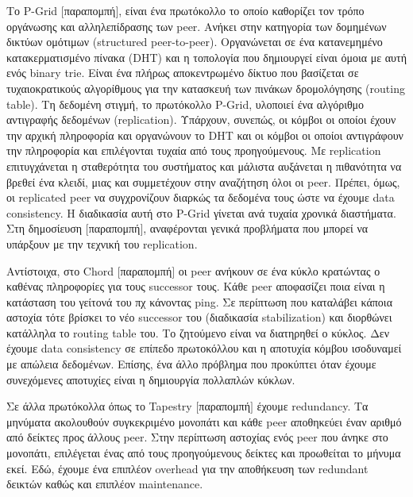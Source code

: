 Το P-Grid $[$παραπομπή$]$, είναι ένα πρωτόκολλο το οποίο καθορίζει τον 
τρόπο οργάνωσης και αλληλεπίδρασης των peer. Ανήκει στην κατηγορία των 
δομημένων δικτύων ομότιμων (structured peer-to-peer). Οργανώνεται σε ένα 
κατανεμημένο κατακερματισμένο πίνακα (DHT) και η τοπολογία που 
δημιουργεί είναι όμοια με αυτή ενός binary trie. Είναι ένα πλήρως 
αποκεντρωμένο δίκτυο που βασίζεται σε τυχαιοκρατικούς αλγορίθμους για 
την κατασκευή των πινάκων δρομολόγησης (routing table). Τη δεδομένη 
στιγμή, το πρωτόκολλο P-Grid, υλοποιεί ένα αλγόριθμο αντιγραφής 
δεδομένων (replication). Υπάρχουν, συνεπώς, οι κόμβοι οι οποίοι έχουν 
την αρχική πληροφορία και οργανώνουν το DHT και οι κόμβοι οι οποίοι 
αντιγράφουν την πληροφορία και επιλέγονται τυχαία από τους 
προηγούμενους. Με replication επιτυγχάνεται η σταθερότητα του συστήματος 
και μάλιστα αυξάνεται η πιθανότητα να βρεθεί ένα κλειδί, μιας και 
συμμετέχουν στην αναζήτηση όλοι οι peer. Πρέπει, όμως, οι replicated 
peer να συγχρονίζουν διαρκώς τα δεδομένα τους ώστε να έχουμε data 
consistency. Η διαδικασία αυτή στο P-Grid γίνεται ανά τυχαία χρονικά 
διαστήματα. Στη δημοσίευση $[$παραπομπή$]$, αναφέρονται γενικά 
προβλήματα που μπορεί να υπάρξουν με την τεχνική του replication.

Αντίστοιχα, στο Chord $[$παραπομπή$]$ οι peer ανήκουν σε ένα κύκλο 
κρατώντας ο καθένας πληροφορίες για τους successor τους. Κάθε peer 
αποφασίζει ποια είναι η κατάσταση του γείτονά του πχ κάνοντας ping. Σε 
περίπτωση που καταλάβει κάποια αστοχία τότε βρίσκει το νέο successor του 
(διαδικασία stabilization) και διορθώνει κατάλληλα το routing table του. 
Το ζητούμενο είναι να διατηρηθεί ο κύκλος. Δεν έχουμε data consistency 
σε επίπεδο πρωτοκόλλου και η αποτυχία κόμβου ισοδυναμεί με απώλεια 
δεδομένων. Επίσης, ένα άλλο πρόβλημα που προκύπτει όταν έχουμε 
συνεχόμενες αποτυχίες είναι η δημιουργία πολλαπλών κύκλων.

Σε άλλα πρωτόκολλα όπως το Tapestry $[$παραπομπή$]$ έχουμε redundancy. 
Τα μηνύματα ακολουθούν συγκεκριμένο μονοπάτι και κάθε peer αποθηκεύει 
έναν αριθμό από δείκτες προς άλλους peer. Στην περίπτωση αστοχίας ενός 
peer που άνηκε στο μονοπάτι, επιλέγεται ένας από τους προηγούμενους 
δείκτες και προωθείται το μήνυμα εκεί. Εδώ, έχουμε ένα επιπλέον overhead 
για την αποθήκευση των redundant δεικτών καθώς και επιπλέον maintenance.
